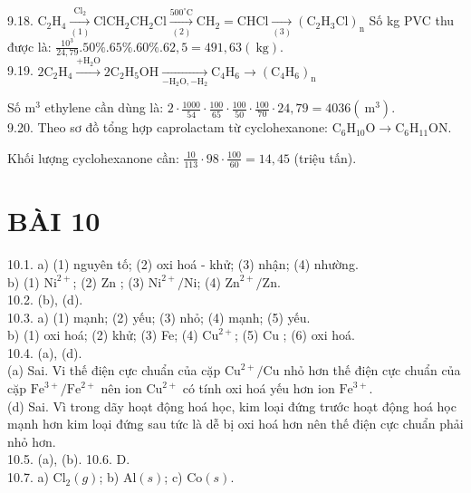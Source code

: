 \documentclass[10pt]{article}
\begin{document}
9.18. $\mathrm{C}_{2} \mathrm{H}_{4} \xrightarrow[(1)]{\mathrm{Cl}_{2}} \mathrm{ClCH}_{2} \mathrm{CH}_{2} \mathrm{Cl} \xrightarrow[(2)]{500^{\circ} \mathrm{C}} \mathrm{CH}_{2}=\mathrm{CHCl} \xrightarrow[(3)]{ }\left(\mathrm{C}_{2} \mathrm{H}_{3} \mathrm{Cl}\right)_{\mathrm{n}}$ Số kg PVC thu được là: $\frac{10^{3}}{24,79} .50 \% .65 \% .60 \% .62,5=491,63(\mathrm{~kg})$.\\
9.19. $2 \mathrm{C}_{2} \mathrm{H}_{4} \xrightarrow{+\mathrm{H}_{2} \mathrm{O}} 2 \mathrm{C}_{2} \mathrm{H}_{5} \mathrm{OH} \xrightarrow[-\mathrm{H}_{2} \mathrm{O},-\mathrm{H}_{2}]{ } \mathrm{C}_{4} \mathrm{H}_{6} \longrightarrow\left(\mathrm{C}_{4} \mathrm{H}_{6}\right)_{\mathrm{n}}$

Số $\mathrm{m}^{3}$ ethylene cần dùng là: $2 \cdot \frac{1000}{54} \cdot \frac{100}{65} \cdot \frac{100}{50} \cdot \frac{100}{70} \cdot 24,79=4036\left(\mathrm{~m}^{3}\right)$.\\
9.20. Theo sơ đồ tổng hợp caprolactam từ cyclohexanone: $\mathrm{C}_{6} \mathrm{H}_{10} \mathrm{O} \rightarrow \mathrm{C}_{6} \mathrm{H}_{11} \mathrm{ON}$.

Khối lượng cyclohexanone cần: $\frac{10}{113} \cdot 98 \cdot \frac{100}{60}=14,45$ (triệu tấn).

\section*{BÀI 10}
10.1. a) (1) nguyên tố; (2) oxi hoá - khử; (3) nhận; (4) nhường.\\
b) (1) $\mathrm{Ni}^{2+}$; (2) Zn ; (3) $\mathrm{Ni}^{2+} / \mathrm{Ni}$; (4) $\mathrm{Zn}^{2+} / \mathrm{Zn}$.\\
10.2. (b), (d).\\
10.3. a) (1) mạnh; (2) yếu; (3) nhỏ; (4) mạnh; (5) yếu.\\
b) (1) oxi hoá; (2) khử; (3) Fe; (4) $\mathrm{Cu}^{2+}$; (5) Cu ; (6) oxi hoá.\\
10.4. (a), (d).\\
(a) Sai. Vi thế điện cực chuẩn của cặp $\mathrm{Cu}^{2+} / \mathrm{Cu}$ nhỏ hơn thế điện cực chuẩn của cặp $\mathrm{Fe}^{3+} / \mathrm{Fe}^{2+}$ nên ion $\mathrm{Cu}^{2+}$ có tính oxi hoá yếu hơn ion $\mathrm{Fe}^{3+}$.\\
(d) Sai. Vì trong dãy hoạt động hoá học, kim loại đứng trước hoạt động hoá học mạnh hơn kim loại đứng sau tức là dễ bị oxi hoá hơn nên thế điện cực chuẩn phải nhỏ hơn.\\
10.5. (a), (b). 10.6. D.\\
10.7. a) $\mathrm{Cl}_{2}(g)$; b) $\mathrm{Al}(s)$; c) $\mathrm{Co}(s)$.
\end{document}

